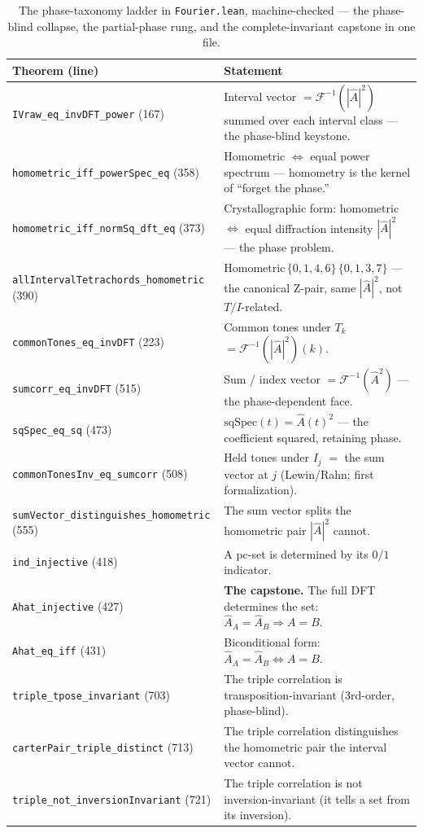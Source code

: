 \documentclass[11pt]{article}
\newcommand{\lean}[1]{\texttt{#1}}
\newcommand{\Ahat}{\hat{A}}
\newcommand{\Fi}{\mathcal{F}^{-1}}
\begin{document}
\begin{table}[ht]
\centering\small
{}
\begin{tabular}{@{}l p{}@{}}
\toprule
\rowcolor{ctA!22}
\textbf{Theorem (line)} & \textbf{Statement}\\
\midrule
\lean{IVraw\_eq\_invDFT\_power} (167)         & Interval vector $=\Fi(|\Ahat|^2)$ summed over each interval class --- the phase-blind keystone.\\
\lean{homometric\_iff\_powerSpec\_eq} (358)   & Homometric $\iff$ equal power spectrum --- homometry is the kernel of ``forget the phase.''\\
\lean{homometric\_iff\_normSq\_dft\_eq} (373) & Crystallographic form: homometric $\iff$ equal diffraction intensity $|\Ahat|^2$ --- the phase problem.\\
\lean{allIntervalTetrachords\_homometric} (390) & $\mathrm{Homometric}\,\{0,1,4,6\}\,\{0,1,3,7\}$ --- the canonical Z-pair, same $|\Ahat|^2$, not $T/I$-related.\\
\lean{commonTones\_eq\_invDFT} (223)          & Common tones under $T_k$ $=\Fi(|\Ahat|^2)(k)$.\\
\lean{sumcorr\_eq\_invDFT} (515)              & Sum / index vector $=\Fi(\Ahat^2)$ --- the phase-dependent face.\\
\lean{sqSpec\_eq\_sq} (473)                   & $\mathrm{sqSpec}(t)=\Ahat(t)^2$ --- the coefficient squared, retaining phase.\\
\lean{commonTonesInv\_eq\_sumcorr} (508)      & Held tones under $I_j$ $=$ the sum vector at $j$ (Lewin/Rahn; first formalization).\\
\lean{sumVector\_distinguishes\_homometric} (555) & The sum vector splits the homometric pair $|\Ahat|^2$ cannot.\\
\lean{ind\_injective} (418)                   & A pc-set is determined by its $0/1$ indicator.\\
\lean{Ahat\_injective} (427)                  & \textbf{The capstone.} The full DFT determines the set: $\Ahat_A=\Ahat_B\Rightarrow A=B$.\\
\lean{Ahat\_eq\_iff} (431)                    & Biconditional form: $\Ahat_A=\Ahat_B\iff A=B$.\\
\lean{triple\_tpose\_invariant} (703)         & The triple correlation is transposition-invariant (3rd-order, phase-blind).\\
\lean{carterPair\_triple\_distinct} (713)     & The triple correlation distinguishes the homometric pair the interval vector cannot.\\
\lean{triple\_not\_inversionInvariant} (721)  & The triple correlation is not inversion-invariant (it tells a set from its inversion).\\
\bottomrule
\end{tabular}
\caption{The phase-taxonomy ladder in \lean{Fourier.lean}, machine-checked --- the phase-blind collapse,
the partial-phase rung, and the complete-invariant capstone in one file.}
\label{tab:lean}
\end{table}
\end{document}
